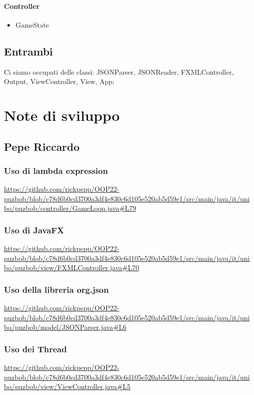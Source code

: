 \documentclass[a4paper,12pt]{report}
\begin{document}
\paragraph{Controller}
\begin{itemize}
\item {GameState}
\end{itemize}  

\subsection{Entrambi}
Ci siamo occupati delle classi: JSONParser, JSONReader, FXMLController, Output, ViewController, View, App;

\section{Note di sviluppo}

\subsection{Pepe Riccardo}
\subsubsection{Uso  di lambda expression}
\centering
\url{https://github.com/rickpepp/OOP22-puzbob/blob/c78d6b0cd3700a3df4e830c6d105e520ab5d59e1/src/main/java/it/unibo/puzbob/controller/GameLoop.java#L79}

\subsubsection{Uso di JavaFX}
\centering
\url{https://github.com/rickpepp/OOP22-puzbob/blob/c78d6b0cd3700a3df4e830c6d105e520ab5d59e1/src/main/java/it/unibo/puzbob/view/FXMLController.java#L70}

\subsubsection{Uso della libreria org.json}
\centering
\url{https://github.com/rickpepp/OOP22-puzbob/blob/c78d6b0cd3700a3df4e830c6d105e520ab5d59e1/src/main/java/it/unibo/puzbob/model/JSONParser.java#L6}

\subsubsection{Uso dei Thread}
\centering
\url{https://github.com/rickpepp/OOP22-puzbob/blob/c78d6b0cd3700a3df4e830c6d105e520ab5d59e1/src/main/java/it/unibo/puzbob/view/ViewController.java#L5}
\end{document}
